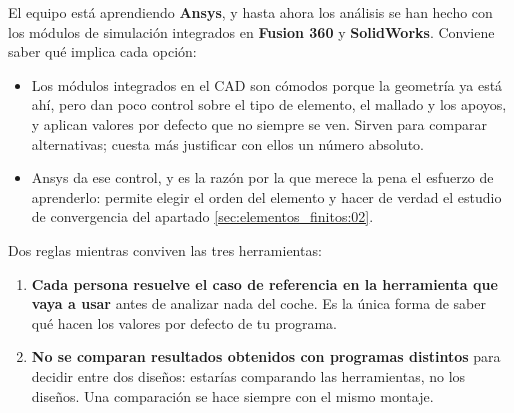 \begin{caso}
El equipo está aprendiendo \textbf{Ansys}, y hasta ahora los análisis se han
hecho con los módulos de simulación integrados en \textbf{Fusion 360} y
\textbf{SolidWorks}. Conviene saber qué implica cada opción:

\begin{itemize}
  \item Los módulos integrados en el CAD son cómodos porque la geometría ya está
        ahí, pero dan poco control sobre el tipo de elemento, el mallado y los
        apoyos, y aplican valores por defecto que no siempre se ven. Sirven para
        comparar alternativas; cuesta más justificar con ellos un número absoluto.
  \item Ansys da ese control, y es la razón por la que merece la pena el esfuerzo
        de aprenderlo: permite elegir el orden del elemento y hacer de verdad el
        estudio de convergencia del apartado
        \ref{sec:elementos_finitos:02}.
\end{itemize}

Dos reglas mientras conviven las tres herramientas:

\begin{enumerate}
  \item \textbf{Cada persona resuelve el caso de referencia en la herramienta que
        vaya a usar} antes de analizar nada del coche. Es la única forma de saber
        qué hacen los valores por defecto de tu programa.
  \item \textbf{No se comparan resultados obtenidos con programas distintos} para
        decidir entre dos diseños: estarías comparando las herramientas, no los
        diseños. Una comparación se hace siempre con el mismo montaje.
\end{enumerate}

\end{caso}

